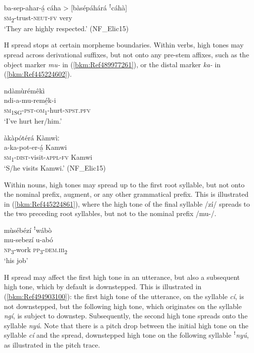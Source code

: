 \ea
\label{bkm:Ref445223852}
\gll ba-sep-ahar-á̲  cáha > [bàsépáhárá ꜝcáhà]\\
\textsc{sm}\textsubscript{2}-trust-\textsc{neut}-\textsc{fv}  very\\
\glt ‘They are highly respected.’ (NF\_Elic15)
\z

H spread stops at certain morpheme boundaries. Within verbs, high tones may spread across derivational suffixes, but not onto any pre-stem affixes, such as the object marker \textit{mu-} in (\ref{bkm:Ref489977261}), or the distal marker \textit{ka-} in (\ref{bkm:Ref445224602}).

\ea
\label{bkm:Ref489977261}
\glll ndàmùrémêkì\\
ndi-a-mu-remé̲k-i \\
\textsc{sm}\textsubscript{1SG}-\textsc{pst}-\textsc{om}\textsubscript{1}-hurt-\textsc{npst}.\textsc{pfv}\\
\glt ‘I’ve hurt her/him.’
\z

\ea
\label{bkm:Ref445224602}
àkàpótérá Kàmwìː\\
\gll a-ka-pot-er-á̲    Kamwi \\
\textsc{sm}\textsubscript{1}-\textsc{dist}-visit-\textsc{appl}-\textsc{fv}  Kamwi\\
\glt ‘S/he visits Kamwi.’ (NF\_Elic15)
\z

Within nouns, high tones may spread up to the first root syllable, but not onto the nominal pre\-fix, augment, or any other grammatical prefix. This is illustrated in (\ref{bkm:Ref445224861}), where the high tone of the final syllable /zí/ spreads to the two preceding root syllables, but not to the nominal prefix /mu-/.

\ea
\label{bkm:Ref445224861}
mùsébézí ꜝwábò\\
\gll mu-sebezí  u-abó\\
\textsc{np}\textsubscript{3}-work  \textsc{pp}\textsubscript{3}-\textsc{dem}.\textsc{iii}\textsubscript{2}\\
\glt ‘his job’
\z

H spread may affect the first high tone in an utterance, but also a subsequent high tone, which by default is downstepped. This is illustrated in (\ref{bkm:Ref494903100}): the first high tone of the utterance, on the syllable \textit{cí}, is not downstepped, but the following high tone, which originates on the sylla\-ble \textit{ngí}, is subject to downstep. Subsequently, the second high tone spreads onto the syllable \textit{nyú}. Note that there is a pitch drop between the initial high tone on the syllable \textit{cí} and the spread, downstepped high tone on the following syllable ꜝ\textit{nyú}, as illustrated in the pitch trace.

